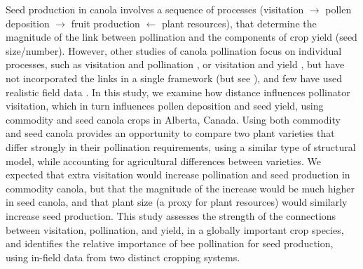 \documentclass[12pt]{article} %
\begin{document}

Seed production in canola involves a sequence of processes (visitation $\rightarrow$ pollen deposition $\rightarrow$ fruit production $\leftarrow$ plant resources), that determine the magnitude of the link between pollination and the components of crop yield (seed size/number).
However, other studies of canola pollination focus on individual processes, such as visitation and pollination \citep{cresswell1999, thomson2001}, or visitation and yield \citep{steffan2003, manning2005, hudewenz2013}, but have not incorporated the links in a single framework (but see \citealp{saez2018}), and few have used realistic field data \citep{morandin2005, isaacs2010}.
In this study, we examine how distance influences pollinator visitation, which in turn influences pollen deposition and seed yield, using commodity and seed canola crops in Alberta, Canada.
Using both commodity and seed canola provides an opportunity to compare two plant varieties that differ strongly in their pollination requirements, using a similar type of structural model, while accounting for agricultural differences between varieties.
We expected that extra visitation would increase pollination and seed production in commodity canola, but that the magnitude of the increase would be much higher in seed canola, and that plant size (a proxy for plant resources) would similarly increase seed production.
This study assesses the strength of the connections between visitation, pollination, and yield, in a globally important crop species, and identifies the relative importance of bee pollination for seed production, using in-field data from two distinct cropping systems.
\end{document}
